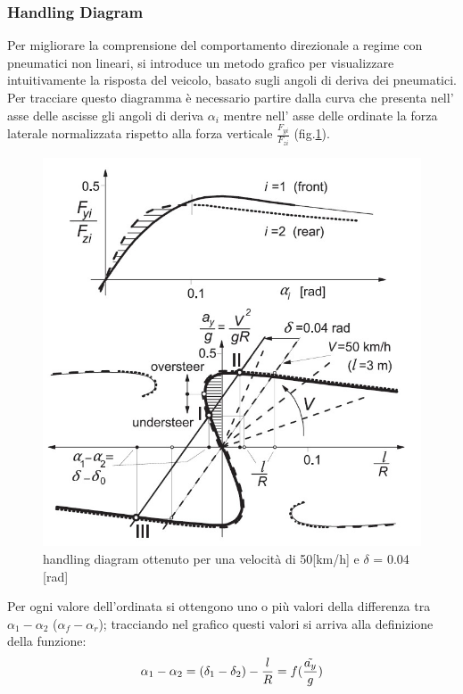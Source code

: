 \subsubsection{Handling Diagram}
Per migliorare la comprensione del comportamento direzionale a regime con pneumatici non lineari, si introduce un metodo
grafico per visualizzare intuitivamente la risposta del veicolo, basato sugli angoli di deriva dei pneumatici.\\
Per tracciare questo diagramma è necessario partire dalla curva che presenta nell' asse delle ascisse gli angoli di deriva
$\alpha_i$ mentre nell' asse delle ordinate la forza laterale normalizzata rispetto alla forza verticale 
$\frac{F_{yi}}{F_{zi}}$ (fig.\ref{fig:example of Handling diagram}).\\
\begin{figure}[!h]
    \centering
    \includegraphics[scale=0.7]{Immagini/Understeer Gradient/example of handling diagram.jpg}
    \caption{handling diagram ottenuto per una velocità di 50[km/h] e $\delta$ = 0.04 [rad]}
    \label{fig:example of Handling diagram}
\end{figure}
Per ogni valore dell'ordinata si ottengono uno o più valori della differenza tra $\alpha_1 - \alpha_2$ ($\alpha_f - 
\alpha_r$); tracciando nel grafico questi valori si arriva alla definizione della funzione:
\begin{equation}
    \alpha_1 - \alpha_2 = (\delta_1 - \delta_2) - \frac{l}{R} = f(\frac{\Tilde{a_y}}{g})
\end{equation}

